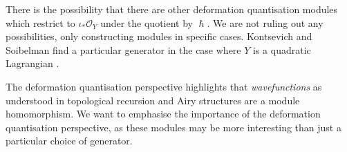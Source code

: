     There is the possibility that there are other deformation quantisation modules which restrict to \(\iota_{*} \mathcal{O}_Y\) under the quotient by \(\hslash\). We are not ruling out any possibilities, only constructing modules in specific cases.
    Kontsevich and Soibelman find a particular generator in the case where \(Y\) is a quadratic Lagrangian \cite{ks_airy}. 
    

    The deformation quantisation perspective highlights that \emph{wavefunctions} as understood in topological recursion and Airy structures are a module homomorphism. 
    We want to emphasise the importance of the deformation quantisation perspective, as these modules may be more interesting than just a particular choice of generator.
    
